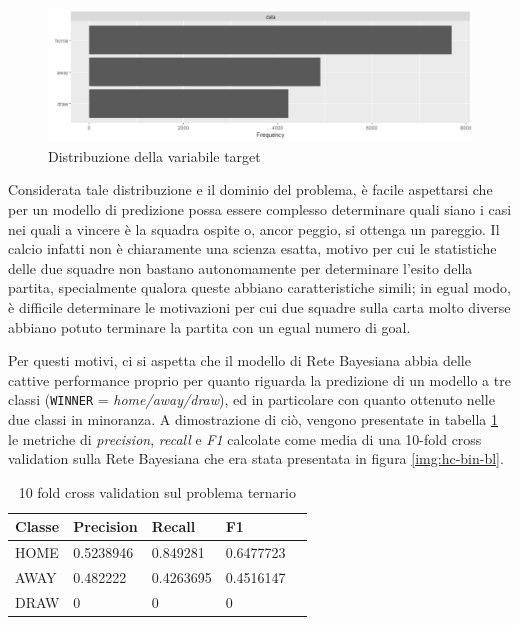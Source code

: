 \documentclass[hidelinks, 12pt]{article}
\begin{document}
\begin{figure}[H]
	\centering
	\includegraphics[scale=0.5]{images/06_01_target-distr.png}
	\caption[Distribuzione della variabile target]{Distribuzione della variabile target}
	\label{img:perf-target-distr}
\end{figure}

Considerata tale distribuzione e il dominio del problema, è facile aspettarsi che per un modello di predizione possa essere complesso determinare quali siano i casi nei quali a vincere è la squadra ospite o, ancor peggio, si ottenga un pareggio. Il calcio infatti non è chiaramente una scienza esatta, motivo per cui le statistiche delle due squadre non bastano autonomamente per determinare l'esito della partita, specialmente qualora queste abbiano caratteristiche simili; in egual modo, è difficile determinare le motivazioni per cui due squadre sulla carta molto diverse abbiano potuto terminare la partita con un egual numero di goal.

Per questi motivi, ci si aspetta che il modello di Rete Bayesiana abbia delle cattive performance proprio per quanto riguarda la predizione di un modello a tre classi (\texttt{WINNER} = \textit{home/away/draw}), ed in particolare con quanto ottenuto nelle due classi in minoranza. A dimostrazione di ciò, vengono presentate in tabella \ref{tab:10-fold-tern} le metriche di \textit{precision}, \textit{recall} e \textit{F1} calcolate come media di una 10-fold cross validation sulla Rete Bayesiana che era stata presentata in figura \ref{img:hc-bin-bl}.

\begin{table}[H]
	\centering
	\caption{10 fold cross validation sul problema ternario}
	\begin{tabular}{l|llll}
		\hline
		Classe & Precision & Recall & F1 \\
		\hline
		HOME & 0.5238946 & 0.849281 & 0.6477723 \\
		AWAY & 0.482222 & 0.4263695 & 0.4516147 \\
		DRAW & 0 & 0 & 0 \\
		\hline
	\end{tabular}
	\label{tab:10-fold-tern}
\end{table}
\end{document}
